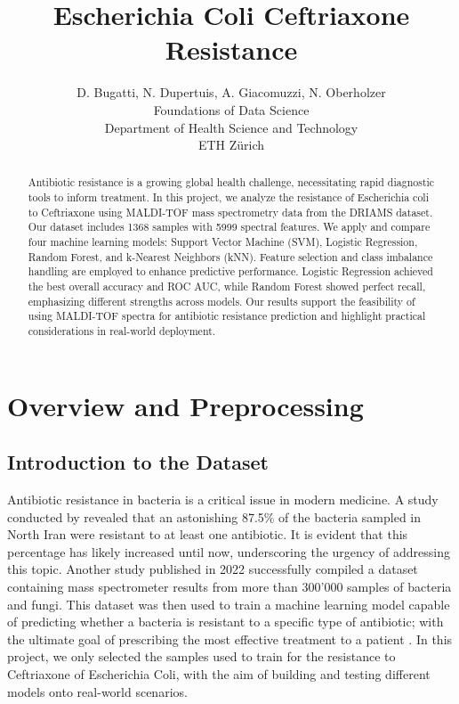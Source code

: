 \documentclass{article}
\title{Escherichia Coli Ceftriaxone Resistance}
\author{%
  D. Bugatti, N. Dupertuis, A. Giacomuzzi, N. Oberholzer\\
  Foundations of Data Science\\
  Department of Health Science and Technology\\
  ETH Zürich\\
}
\begin{document}
\maketitle

\begin{abstract}
Antibiotic resistance is a growing global health challenge, necessitating rapid diagnostic tools to inform treatment. In this project, we analyze the resistance of Escherichia coli to Ceftriaxone using MALDI-TOF mass spectrometry data from the DRIAMS dataset. Our dataset includes 1368 samples with 5999 spectral features. We apply and compare four machine learning models: Support Vector Machine (SVM), Logistic Regression, Random Forest, and k-Nearest Neighbors (kNN). Feature selection and class imbalance handling are employed to enhance predictive performance. Logistic Regression achieved the best overall accuracy and ROC AUC, while Random Forest showed perfect recall, emphasizing different strengths across models. Our results support the feasibility of using MALDI-TOF spectra for antibiotic resistance prediction and highlight practical considerations in real-world deployment.
\end{abstract}


\section{Overview and Preprocessing}

\subsection{Introduction to the Dataset}

Antibiotic resistance in bacteria is a critical issue in modern medicine. A study conducted by \citet{IranBacteria} revealed that an astonishing 87.5\% of the bacteria sampled in North Iran were resistant to at least
one antibiotic. It is evident that this percentage has likely increased until now, underscoring the urgency
of addressing this topic. Another study published in 2022 successfully compiled a dataset containing mass
spectrometer results from more than 300’000 samples of bacteria and fungi. This dataset was then used to
train a machine learning model capable of predicting whether a bacteria is resistant to a specific type of
antibiotic; with the ultimate goal of prescribing the most effective treatment to a patient \citep{datasetExplaination}. In this
project, we only selected the samples used to train for the resistance to Ceftriaxone of Escherichia Coli,
with the aim of building and testing different models onto real-world scenarios.
\end{document}
